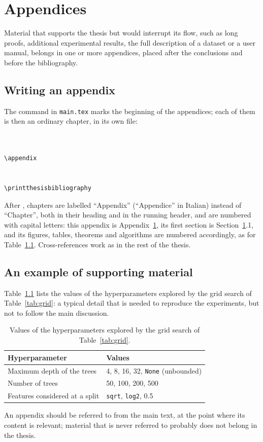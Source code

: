 \chapter{Appendices} \label{app:appendices}

Material that supports the thesis but would interrupt its flow, such as
long proofs, additional experimental results, the full description of a
dataset or a user manual, belongs in one or more appendices, placed after
the conclusions and before the bibliography.

\section{Writing an appendix}

The command  in \texttt{main.tex} marks the beginning of the
appendices; each of them is then an ordinary chapter, in its own file:
\begin{Verbatim}


\appendix


\printthesisbibliography
\end{Verbatim}
After , chapters are labelled ``Appendix'' (``Appendice'' in
Italian) instead of ``Chapter'', both in their heading and in the running
header, and are numbered with capital letters: this appendix is
Appendix~\ref{app:appendices}, its first section is
Section~\ref{app:appendices}.1, and its figures, tables, theorems and
algorithms are numbered accordingly, as for Table~\ref{tab:search-space}.
Cross-references work as in the rest of the thesis.

\section{An example of supporting material}

Table~\ref{tab:search-space} lists the values of the hyperparameters
explored by the grid search of Table~\ref{tab:grid}: a typical detail that
is needed to reproduce the experiments, but not to follow the main
discussion.

\begin{table}[htbp]
  \centering
  \caption[Search space of the grid search]{Values of the hyperparameters
    explored by the grid search of Table~\ref{tab:grid}.}
  \label{tab:search-space}
  \begin{tabular}{ll}
    \toprule
    Hyperparameter & Values \\
    \midrule
    Maximum depth of the trees      & 4, 8, 16, 32, \texttt{None} (unbounded) \\
    Number of trees                 & 50, 100, 200, 500 \\
    Features considered at a split  & \texttt{sqrt}, \texttt{log2}, 0.5 \\
    \bottomrule
  \end{tabular}
\end{table}

An appendix should be referred to from the main text, at the point where
its content is relevant; material that is never referred to probably does
not belong in the thesis.
